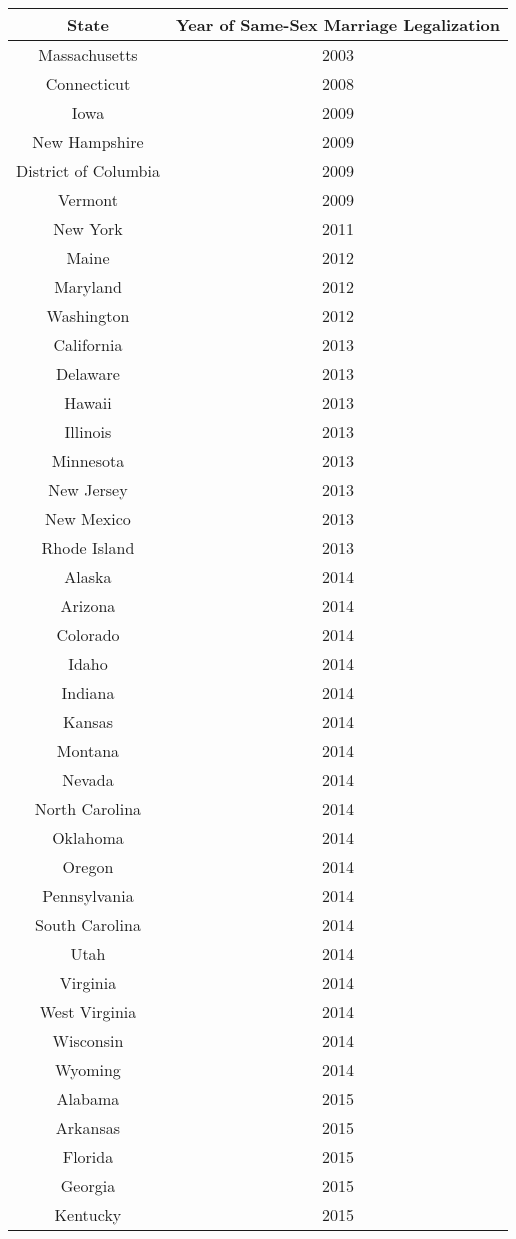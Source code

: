 \begin{longtable}{|c|c|}
\hline
\textbf{State} & \textbf{Year of Same-Sex Marriage Legalization} \\
\hline
Massachusetts & 2003 \\
Connecticut & 2008 \\
Iowa & 2009 \\
New Hampshire & 2009 \\
District of Columbia & 2009 \\
Vermont & 2009 \\
New York & 2011 \\
Maine & 2012 \\
Maryland & 2012 \\
Washington & 2012 \\
California & 2013 \\
Delaware & 2013 \\
Hawaii & 2013 \\
Illinois & 2013 \\
Minnesota & 2013 \\
New Jersey & 2013 \\
New Mexico & 2013 \\
Rhode Island & 2013 \\
Alaska & 2014 \\
Arizona & 2014 \\
Colorado & 2014 \\
Idaho & 2014 \\
Indiana & 2014 \\
Kansas & 2014 \\
Montana & 2014 \\
Nevada & 2014 \\
North Carolina & 2014 \\
Oklahoma & 2014 \\
Oregon & 2014 \\
Pennsylvania & 2014 \\
South Carolina & 2014 \\
Utah & 2014 \\
Virginia & 2014 \\
West Virginia & 2014 \\
Wisconsin & 2014 \\
Wyoming & 2014 \\
Alabama & 2015 \\
Arkansas & 2015 \\
Florida & 2015 \\
Georgia & 2015 \\
Kentucky & 2015 \\

\end{longtable}
